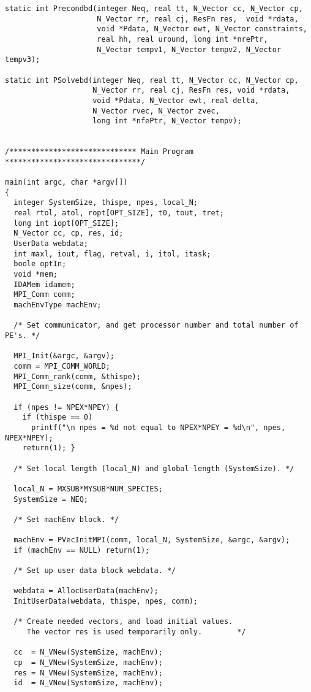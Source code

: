 \begin{verbatim}
static int Precondbd(integer Neq, real tt, N_Vector cc, N_Vector cp,
                     N_Vector rr, real cj, ResFn res,  void *rdata,
                     void *Pdata, N_Vector ewt, N_Vector constraints,
                     real hh, real uround, long int *nrePtr, 
                     N_Vector tempv1, N_Vector tempv2, N_Vector tempv3);

static int PSolvebd(integer Neq, real tt, N_Vector cc, N_Vector cp,
                    N_Vector rr, real cj, ResFn res, void *rdata,
                    void *Pdata, N_Vector ewt, real delta,
                    N_Vector rvec, N_Vector zvec,
                    long int *nfePtr, N_Vector tempv);


/***************************** Main Program *******************************/

main(int argc, char *argv[])
{
  integer SystemSize, thispe, npes, local_N;
  real rtol, atol, ropt[OPT_SIZE], t0, tout, tret;
  long int iopt[OPT_SIZE];
  N_Vector cc, cp, res, id;
  UserData webdata;
  int maxl, iout, flag, retval, i, itol, itask;
  boole optIn;
  void *mem;
  IDAMem idamem;
  MPI_Comm comm;
  machEnvType machEnv;

  /* Set communicator, and get processor number and total number of PE's. */

  MPI_Init(&argc, &argv);
  comm = MPI_COMM_WORLD;
  MPI_Comm_rank(comm, &thispe);
  MPI_Comm_size(comm, &npes);

  if (npes != NPEX*NPEY) {
    if (thispe == 0)
      printf("\n npes = %d not equal to NPEX*NPEY = %d\n", npes, NPEX*NPEY);
    return(1); }

  /* Set local length (local_N) and global length (SystemSize). */

  local_N = MXSUB*MYSUB*NUM_SPECIES;
  SystemSize = NEQ;

  /* Set machEnv block. */

  machEnv = PVecInitMPI(comm, local_N, SystemSize, &argc, &argv);
  if (machEnv == NULL) return(1);

  /* Set up user data block webdata. */

  webdata = AllocUserData(machEnv);
  InitUserData(webdata, thispe, npes, comm);

  /* Create needed vectors, and load initial values.
     The vector res is used temporarily only.        */

  cc  = N_VNew(SystemSize, machEnv);
  cp  = N_VNew(SystemSize, machEnv);
  res = N_VNew(SystemSize, machEnv);
  id  = N_VNew(SystemSize, machEnv);


\end{verbatim}
